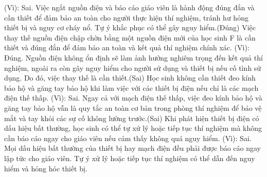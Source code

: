 \begin{ex}
{(Vì):  Sai. Việc ngắt nguồn điện và báo cáo giáo viên là hành động đúng đắn và cần thiết để đảm bảo an toàn cho người thực hiện thí nghiệm, tránh hư hỏng thiết bị và nguy cơ cháy nổ. Tự ý khắc phục có thể gây nguy hiểm.(Đúng)  Việc thay thế nguồn điện chập chờn bằng một nguồn điện mới của học sinh F là cần thiết và đúng đắn để đảm bảo an toàn và kết quả thí nghiệm chính xác.
(Vì):  Đúng. Nguồn điện không ổn định sẽ làm ảnh hưởng nghiêm trọng đến kết quả thí nghiệm, ngoài ra còn gây nguy hiểm cho người sử dụng và thiết bị nếu cố tình sử dụng. Do đó, việc thay thế là cần thiết.(Sai)  Học sinh không cần thiết đeo kính bảo hộ và găng tay bảo hộ khi làm việc với các thiết bị điện nếu chỉ là các mạch điện thế thấp.
(Vì):  Sai. Ngay cả với mạch điện thế thấp, việc đeo kính bảo hộ và găng tay bảo hộ vẫn là quy tắc an toàn cơ bản trong phòng thí nghiệm để bảo vệ mắt và tay khỏi các sự cố không lường trước.(Sai)  Khi phát hiện thiết bị điện có dấu hiệu bất thường, học sinh có thể tự xử lý hoặc tiếp tục thí nghiệm mà không cần báo cáo ngay cho giáo viên nếu cảm thấy không quá nguy hiểm.
(Vì):  Sai. Mọi dấu hiệu bất thường của thiết bị hay mạch điện đều phải được báo cáo ngay lập tức cho giáo viên. Tự ý xử lý hoặc tiếp tục thí nghiệm có thể dẫn đến nguy hiểm và hỏng hóc thiết bị.}
\end{ex}

